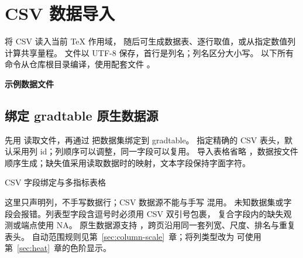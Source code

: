 \section{CSV 数据导入}
\label{sec:csv-input}
 将 CSV 读入当前 TeX 作用域，
随后可生成数据表、逐行取值，或从指定数值列计算共享量程。
文件以 UTF-8 保存，首行是列名；列名区分大小写。
以下所有命令从仓库根目录编译，使用配套文件 。

\textbf{示例数据文件}\par


\subsection{绑定 gradtable 原生数据源}
\label{sec:csv-native}
先用 \key{\gradbarsloadcsv} 读取文件，再通过  把数据集绑定到 gradtable。
 指定精确的 CSV 表头，默认采用列 id；列顺序可以调整，同一字段可以复用。
导入表格省略 ，数据按文件顺序生成；缺失值采用读取数据时的映射，文本字段保持字面字符。
\begin{example}[text and listing,sidebyside=false]{CSV 字段绑定与多指标表格}
\begin{gradtable}[data=results,width=\linewidth,scale=column,header align=c]
\end{gradtable}
\end{example}
这里只声明列，不手写数据行；CSV 数据源不能与手写  混用。
未知数据集或字段会报错。列表型字段含逗号时必须用 CSV 双引号包裹，
复合字段内的缺失观测或端点使用 NA。
原生数据源支持 ，跨页沿用同一套列宽、尺度、排名与重复表头。
自动范围规则见第~\ref{sec:column-scale}~章；将列类型改为  可使用第~\ref{sec:heat}~章的色阶显示。

